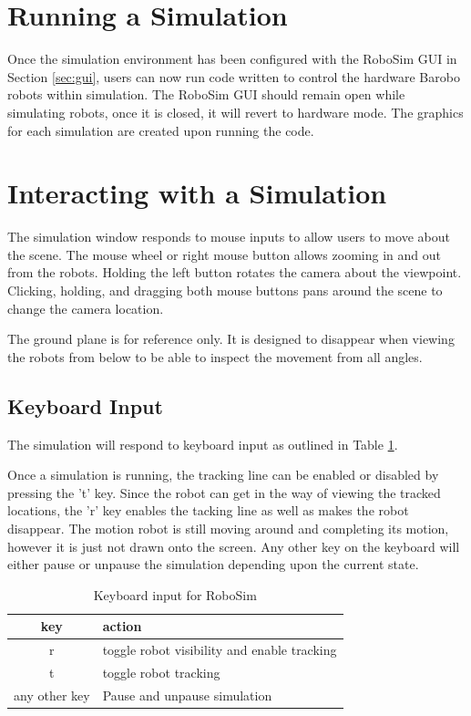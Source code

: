 \documentclass{article}
\begin{document}
\section{Running a Simulation}
Once the simulation environment has been configured with the RoboSim GUI in
Section \ref{sec:gui}, users can now run code written to control the hardware
Barobo robots within simulation.  The RoboSim GUI should remain open while
simulating robots, once it is closed, it will revert to hardware mode.  The
graphics for each simulation are created upon running the code.

\section{Interacting with a Simulation}
The simulation window responds to mouse inputs to allow users to move about the
scene.  The mouse wheel or right mouse button allows zooming in and out from the
robots.  Holding the left button rotates the camera about the viewpoint.
Clicking, holding, and dragging both mouse buttons pans around the scene to
change the camera location.

The ground plane is for reference only.  It is designed to disappear when
viewing the robots from below to be able to inspect the movement from all
angles.

\subsection{Keyboard Input}
The simulation will respond to keyboard input as outlined in Table
\ref{tab:keys}.

Once a simulation is running, the tracking line can be enabled or
disabled by pressing the 't' key.  Since the robot can get in the way of viewing
the tracked locations, the 'r' key enables the tacking line as well as makes the
robot disappear.  The motion robot is still moving around and completing its
motion, however it is just not drawn onto the screen.  Any other key on the
keyboard will either pause or unpause the simulation depending upon the current
state.
\begin{table}[H]
	\begin{center}
	\begin{tabular}{c | l }
		\hline \hline
		\textbf{key} & \textbf{action} \\ \hline
		r & toggle robot visibility and enable tracking \\
		t & toggle robot tracking \\
		any other key & Pause and unpause simulation \\
		\hline \hline
	\end{tabular}
	\caption{Keyboard input for RoboSim}
	\label{tab:keys}
	\end{center}
\end{table}
\end{document}
